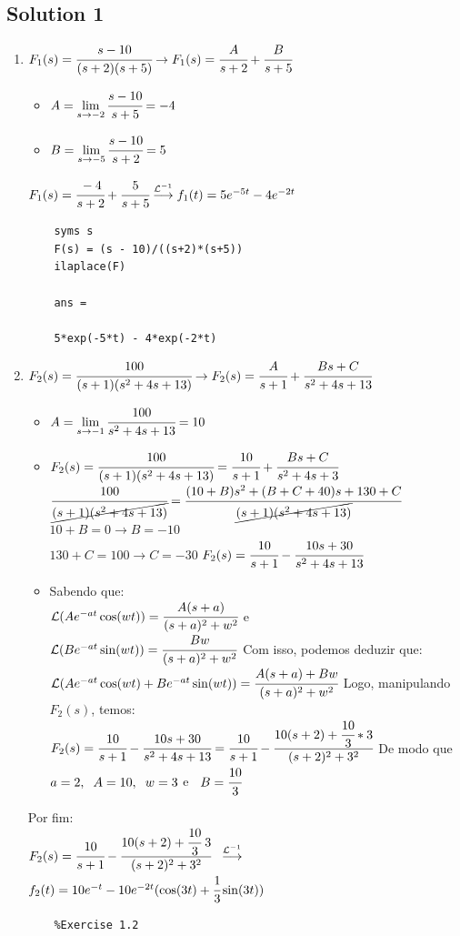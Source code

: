 \documentclass[a4paper,11pt]{article}
\begin{document}
\subsection*{Solution 1}
\begin{enumerate}
	\item $F_1(s)=\cfrac{s-10}{(s+2)(s+5)}\rightarrow F_1(s)=\cfrac{A}{s+2}+\cfrac{B}{s+5}$
	\begin{itemize}
		\item $ A = \lim\limits_{s\to-2}\cfrac{s-10}{s+5} = -4$
		\item $ B = \lim\limits_{s\to-5}\cfrac{s-10}{s+2} = 5$
	\end{itemize}
	$F_1(s)=\cfrac{-4}{s+2}+\cfrac{5}{s+5}
	\overset{\mathcal{L}^{-1}}{\longrightarrow}
	f_1(t)=5e^{-5t}-4e^{-2t}$
	\begin{lstlisting}
	syms s
	F(s) = (s - 10)/((s+2)*(s+5))
	ilaplace(F)
	
	ans =
	
	5*exp(-5*t) - 4*exp(-2*t)
	\end{lstlisting}
	\item $F_2(s)=\cfrac{100}{(s+1)(s^2+4s+13)}\rightarrow
	F_2(s)=\cfrac{A}{s+1}+\cfrac{Bs+C}{s^2+4s+13}$
	\begin{itemize}
		\item $ A= \lim\limits_{s\to-1}\cfrac{100}{s^2+4s+13}=10$
		\item $ F_2(s)=\cfrac{100}{(s+1)(s^2+4s+13)} =\cfrac{10}{s+1}+\cfrac{Bs+C}{s^2+4s+3}$
		\vskip0.4cm $\cfrac{100}{\cancel{(s+1)(s^2+4s+13)}}=\cfrac{(10+B)s^2+(B+C+40)s+130+C}{\cancel{(s+1)(s^2+4s+13)}}$
		\vskip0.4cm
		 $10+B=0\rightarrow B=-10$ 
		 \\$130+C=100\rightarrow C=-30$
		 \vskip0.4cm
		 $F_2(s)=\cfrac{10}{s+1}-\cfrac{10s+30}{s^2+4s+13}$
		 \vskip0.4cm
		 \item Sabendo que:
		 \\$\mathcal{L}(Ae^{-at}\cos(wt))=\cfrac{A(s+a)}{(s+a)^2+w^2}$
		 \hspace{0.2cm} e 
		 \\$\mathcal{L}(Be^{-at}\sin(wt))=\cfrac{Bw}{(s+a)^2+w^2}$
		 \vskip0.4cm
		 Com isso, podemos deduzir que:
		 \\$\mathcal{L}(Ae^{-at}\cos(wt)+Be^{-at}\sin(wt))=
		 \cfrac{A(s+a)+Bw}{(s+a)^2+w^2}$
		 \vskip0.4cm
		 Logo, manipulando $F_2(s)$, temos:
		 \\$F_2(s)=\cfrac{10}{s+1}-\cfrac{10s+30}{s^2+4s+13}=
		 \cfrac{10}{s+1}-\cfrac{10(s+2)+\cfrac{10}{3}*3}{(s+2)^2+3^2}$ \vskip0.4cm
		 De modo que $a = 2, \hskip0.2cm A=10, \hskip0.2cm w=3$\hskip0.2cm
		 e $\hskip0.2cm B=\cfrac{10}{3}$
	\end{itemize}
	Por fim:
	\\$F_2(s)=\cfrac{10}{s+1}-\cfrac{10(s+2)+\cfrac{10}{3}\hskip0.1cm3}{(s+2)^2+3^2}
	\hskip0.2cm\overset{\mathcal{L}^{-1}}{\longrightarrow}$
	\vskip0.4cm
	$f_2(t) = 10e^{-t}-10e^{-2t}(\cos(3t)+\cfrac{1}{3}\sin(3t)) $
	\newpage
	\begin{lstlisting}
	%Exercise 1.2
	

\end{lstlisting}
\end{enumerate}
\end{document}
